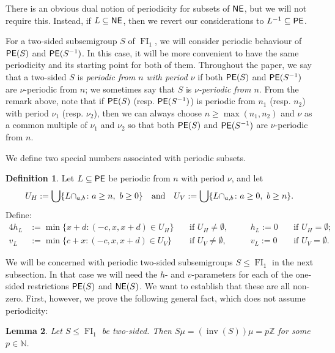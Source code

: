 \documentclass[reqno]{amsart}
\theoremstyle{plain}
\newtheorem{lem}{Lemma}[section]
\theoremstyle{definition}
\newtheorem{defn}[lem]{Definition}
\DeclareMathOperator{\inv}{inv}
\DeclareMathOperator{\FI}{FI}
\let\P\relax
\DeclareMathOperator{\P}{\textup{\textsf{P}}}
\DeclareMathOperator{\PE}{\textup{\textsf{PE}}}
\DeclareMathOperator{\NE}{\textup{\textsf{NE}}}
\numberwithin{equation}{section}
\begin{document}
There is an obvious dual notion of periodicity for subsets of $\NE$, but we will not require this. Instead, if $L\subseteq \NE$, then we revert our considerations to $L^{-1}\subseteq \PE$.



For a two-sided subsemigroup $S$ of $\FI_1$, we will consider periodic behaviour of $\PE(S)$ and $\PE(S^{-1})$. In this case, it will be more convenient to have the same periodicity and its starting point for both of them. Throughout the paper, we say that a two-sided $S$ is \emph{periodic from $n$ with period $\nu$} if both $\PE(S)$ and $\PE(S^{-1})$ are $\nu$-periodic from $n$; we sometimes say that $S$ is \emph{$\nu$-periodic from $n$}. From the remark above, note that if $\PE(S)$ (resp. $\PE(S^{-1})$) is periodic from $n_1$ (resp. $n_2$) with period $\nu_1$ (resp. $\nu_2$), then we can always choose $n\geq \max(n_1, n_2)$ and $\nu$ as a common multiple of $\nu_1$ and $\nu_2$ so that both $\PE(S)$ and $\PE(S^{-1})$ are $\nu$-periodic from $n$.






We define two special numbers associated with periodic subsets.

\begin{defn}
\label{defn:HorizonVertNumbers}
Let $L\subseteq\PE$ be periodic from $n$ with period $\nu$, and let
\[
U_H:= \bigcup \{ L\cap \P_{a,b}\colon a\geq n,\ b\geq 0\}
\quad\text{and}\quad
U_V:= \bigcup \{ L\cap \P_{a,b}\colon a\geq 0,\ b\geq n\}.
\]
Define:
\begin{alignat*}{4}
h_{L} &:=
\min\bigl\{x+d: (-c, x, x+d) \in U_H\bigr\}\ && \text{if } U_H\neq \emptyset,\quad&&
h_L:=0\ &&\text{if } U_H=\emptyset;
\\
v_{L} &:=
\min\bigl\{c+x: (-c, x, x+d)\in U_V\bigr\}  &&\text{if } U_V\neq \emptyset,&&
v_L:=0&& \text{if } U_V=\emptyset.
\end{alignat*}
\end{defn}


We will be concerned with periodic two-sided subsemigroups $S\leq\FI_1$ in the next subsection. 
In that case we will need the $h$- and $v$-parameters for each of the one-sided restrictions $\PE(S)$ and $\NE(S)$. We want to establish that these are all non-zero. First, however, we prove the following general fact, which does not assume periodicity:



\begin{lem}
\label{lem:SInvPhi}
Let $S\leq \FI_1$ be two-sided. Then $S\mu = (\inv(S))\mu = p\mathbb{Z}$ for some $p\in \mathbb{N}$.
\end{lem}
\end{document}
